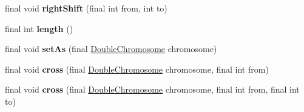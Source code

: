 \begin{DoxyCompactItemize}
\item 
\hypertarget{classjenes_1_1chromosome_1_1_double_chromosome_ae2c6d9bac13241a8338623c612d0f70b}{final void {\bfseries right\-Shift} (final int from, int to)}\label{classjenes_1_1chromosome_1_1_double_chromosome_ae2c6d9bac13241a8338623c612d0f70b}

\item 
\hypertarget{classjenes_1_1chromosome_1_1_double_chromosome_a0938c891dcd64d56dcbfbc9136438b92}{final int {\bfseries length} ()}\label{classjenes_1_1chromosome_1_1_double_chromosome_a0938c891dcd64d56dcbfbc9136438b92}

\item 
\hypertarget{classjenes_1_1chromosome_1_1_double_chromosome_a7479d1ee74934b04f478dcf8fad35464}{final void {\bfseries set\-As} (final \hyperlink{classjenes_1_1chromosome_1_1_double_chromosome}{Double\-Chromosome} chromosome)}\label{classjenes_1_1chromosome_1_1_double_chromosome_a7479d1ee74934b04f478dcf8fad35464}

\item 
\hypertarget{classjenes_1_1chromosome_1_1_double_chromosome_a0461bfc35a8ca0c503ba0a4017005f89}{final void {\bfseries cross} (final \hyperlink{classjenes_1_1chromosome_1_1_double_chromosome}{Double\-Chromosome} chromosome, final int from)}\label{classjenes_1_1chromosome_1_1_double_chromosome_a0461bfc35a8ca0c503ba0a4017005f89}

\item 
\hypertarget{classjenes_1_1chromosome_1_1_double_chromosome_acaad58427cf1db8071fe2032755bbdce}{final void {\bfseries cross} (final \hyperlink{classjenes_1_1chromosome_1_1_double_chromosome}{Double\-Chromosome} chromosome, final int from, final int to)}\label{classjenes_1_1chromosome_1_1_double_chromosome_acaad58427cf1db8071fe2032755bbdce}


\end{DoxyCompactItemize}
